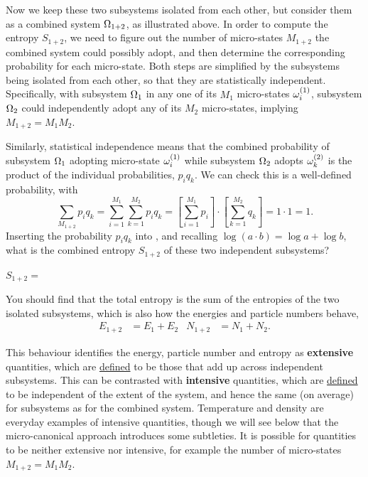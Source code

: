 Now we keep these two subsystems isolated from each other, but consider them as a combined system $\Omega_{1+2}$, as illustrated above.
In order to compute the entropy $S_{1+2}$, we need to figure out the number of micro-states $M_{1+2}$ the combined system could possibly adopt, and then determine the corresponding probability for each micro-state.
Both steps are simplified by the subsystems being isolated from each other, so that they are statistically independent.
Specifically, with subsystem $\Omega_1$ in any one of its $M_1$ micro-states $\omega_i^{(1)}$, subsystem $\Omega_2$ could independently adopt any of its $M_2$ micro-states, implying $M_{1+2} = M_1 M_2$.

Similarly, statistical independence means that the combined probability of subsystem $\Omega_1$ adopting micro-state $\omega_i^{(1)}$ while subsystem $\Omega_2$ adopts $\omega_k^{(2)}$ is the product of the individual probabilities, $p_i q_k$.
We can check this is a well-defined probability, with
\begin{equation*}
  \sum_{M_{1+2}} p_i q_k = \sum_{i = 1}^{M_1} \sum_{k = 1}^{M_2} p_i q_k = \left[\sum_{i = 1}^{M_1} p_i\right]\cdot \left[\sum_{k = 1}^{M_2} q_k\right] = 1\cdot 1 = 1.
\end{equation*}
Inserting the probability $p_i q_k$ into , and recalling $\log(a\cdot b) = \log a + \log b$, what is the combined entropy $S_{1+2}$ of these two independent subsystems?
\begin{mdframed}
  $S_{1+2} = $ \\[100 pt]
\end{mdframed}
You should find that the total entropy is the sum of the entropies of the two isolated subsystems, which is also how the energies and particle numbers behave,
\begin{align*}
  E_{1+2} & = E_1 + E_2 &
  N_{1+2} & = N_1 + N_2.
\end{align*}

This behaviour identifies the energy, particle number and entropy as \textbf{extensive} quantities, which are \href{https://goldbook.iupac.org/terms/view/E02281}{defined} to be those that add up across independent subsystems.
This can be contrasted with \textbf{intensive} quantities, which are \href{https://goldbook.iupac.org/terms/view/I03074}{defined} to be independent of the extent of the system, and hence the same (on average) for subsystems as for the combined system. %
Temperature and density are everyday examples of intensive quantities, though we will see below that the micro-canonical approach introduces some subtleties.
It is possible for quantities to be neither extensive nor intensive, for example the number of micro-states $M_{1+2} = M_1 M_2$.

